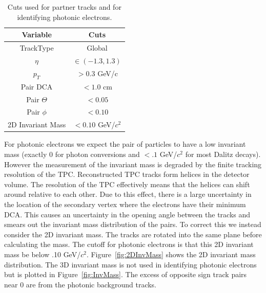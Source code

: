 \begin{table}
\centering
\begin{tabular}{|c|c|}
\hline
Variable         & Cuts \\
\hline
TrackType   & Global \\
\hline
$\eta$   & $\in(-1.3,1.3)$ \\
\hline
$p_T$   & $> 0.3$ GeV/c \\
\hline
Pair DCA  & $< 1.0$ cm \\
\hline
Pair $\Theta$   & $< 0.05$ \\
\hline
Pair $\phi$   & $< 0.10$ \\
\hline
2D Invariant Mass   & $< 0.10$ GeV/$c^2$ \\
\hline
\end{tabular}
\caption[Photonic Electron Cuts]{Cuts used for partner tracks and for identifying photonic electrons.}
\label{tab:pe_cuts}
\end{table}

For photonic electrons we expect the pair of particles to have a low invariant mass (exactly 0 for photon conversions and $< .1$ GeV/$c^2$ for most Dalitz decays). However the measurement of the invariant mass is degraded by the finite tracking resolution of the TPC. Reconstructed TPC tracks form helices in the detector volume. The resolution of the TPC effectively means that the helices can shift around relative to each other. Due to this effect, there is a large uncertainty in the location of the secondary vertex where the electrons have their minimum DCA. This causes an uncertainty in the opening angle between the tracks and smears out the invariant mass distribution of the pairs. To correct this we instead consider the 2D invariant mass. The tracks are rotated into the same plane before calculating the mass. The cutoff for photonic electrons is that this 2D invariant mass be below .10 GeV/$c^2$. Figure~\ref{fig:2DInvMass} shows the 2D invariant mass distribution. The 3D invariant mass is not used in identifying photonic electrons but is plotted in Figure~\ref{fig:InvMass}. The excess of opposite sign track pairs near 0 are from the photonic background tracks.

